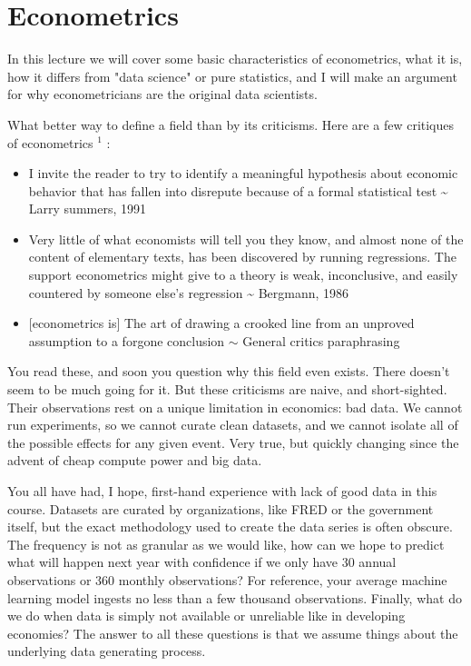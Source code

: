 \documentclass[10pt]{article}
\begin{document}
\section*{Econometrics}
In this lecture we will cover some basic characteristics of econometrics, what it is, how it differs from "data science" or pure statistics, and I will make an argument for why econometricians are the original data scientists.

What better way to define a field than by its criticisms. Here are a few critiques of econometrics ${ }^{1}$ :

\begin{itemize}
  \item I invite the reader to try to identify a meaningful hypothesis about economic behavior that has fallen into disrepute because of a formal statistical test \~{} Larry summers, 1991
  \item Very little of what economists will tell you they know, and almost none of the content of elementary texts, has been discovered by running regressions. The support econometrics might give to a theory is weak, inconclusive, and easily countered by someone else's regression \~{} Bergmann, 1986
  \item \hspace{0pt} [econometrics is] The art of drawing a crooked line from an unproved assumption to a forgone conclusion $\sim$ General critics paraphrasing
\end{itemize}

You read these, and soon you question why this field even exists. There doesn't seem to be much going for it. But these criticisms are naive, and short-sighted. Their observations rest on a unique limitation in economics: bad data. We cannot run experiments, so we cannot curate clean datasets, and we cannot isolate all of the possible effects for any given event. Very true, but quickly changing since the advent of cheap compute power and big data.

You all have had, I hope, first-hand experience with lack of good data in this course. Datasets are curated by organizations, like FRED or the government itself, but the exact methodology used to create the data series is often obscure. The frequency is not as granular as we would like, how can we hope to predict what will happen next year with confidence if we only have 30 annual observations or 360 monthly observations? For reference, your average machine learning model ingests no less than a few thousand observations. Finally, what do we do when data is simply not available or unreliable like in developing economies? The answer to all these questions is that we assume things about the underlying data generating process.
\end{document}
